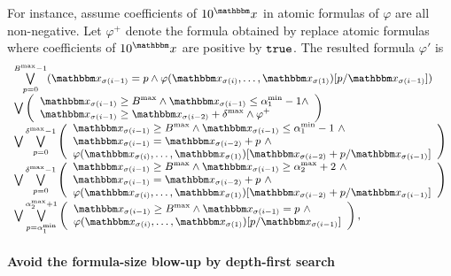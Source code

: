 For instance, assume coefficients of $10^\ivarx$ in atomic formulas of $\varphi$ are all non-negative. Let $\varphi^+$ denote the formula obtained by replace atomic formulas where coefficients of $10^\ivarx$ are positive by $\mathtt{true}$. The resulted formula $\varphi'$ is
\[
\small
\begin{array}{l}
\bigvee \limits_{p=0}^{B^{\max}-1} ( \ivarx_{\sigma(i-1)} = p \wedge \varphi(\ivarx_{\sigma(i)}, \ldots, \ivarx_{\sigma(1)}) [p/\ivarx_{\sigma(i-1)}])   \\
\bigvee \left(
    \begin{array}{l}
        \ivarx_{\sigma(i-1)} \ge B^{\max} \wedge \ivarx_{\sigma(i-1)} \le \alpha^{\min}_1  - 1  \wedge \\
        \ivarx_{\sigma(i-1)} \ge \ivarx_{\sigma(i-2)} +\delta^{\max} \wedge \varphi^+  
    \end{array}
    \right)\\
%
\bigvee \bigvee \limits_{p=0}^{\delta^{\max}-1} 
\left(
\begin{array}{l}
\ivarx_{\sigma(i-1)} \ge B^{\max} \wedge \ivarx_{\sigma(i-1)} \le \alpha^{\min}_1  -1 \ \wedge \\
 \ivarx_{\sigma(i-1)} = \ivarx_{\sigma(i-2)} +p\ \wedge\\
 \varphi(\ivarx_{\sigma(i)}, \ldots, \ivarx_{\sigma(1)})[\ivarx_{\sigma(i-2)} + p /\ivarx_{\sigma(i-1)}] 
\end{array}
\right)\\
\bigvee \bigvee \limits_{p=0}^{\delta^{\max}-1} 
\left(
\begin{array}{l}
\ivarx_{\sigma(i-1)} \ge B^{\max} \wedge \ivarx_{\sigma(i-1)} \ge \alpha^{\max}_2 + 2 \ \wedge \\
 \ivarx_{\sigma(i-1)} = \ivarx_{\sigma(i-2)} +p\ \wedge\\
 \varphi(\ivarx_{\sigma(i)}, \ldots, \ivarx_{\sigma(1)})[\ivarx_{\sigma(i-2)} + p /\ivarx_{\sigma(i-1)}] 
\end{array}
\right)\\
\bigvee \bigvee \limits_{p = \alpha^{\min}_1}^{\alpha^{\max}_2 + 1}
\left(
\begin{array}{l}
\ivarx_{\sigma(i-1)} \ge B^{\max} \wedge \ivarx_{\sigma(i-1)} = p\ \wedge \\
 \varphi(\ivarx_{\sigma(i)}, \ldots, \ivarx_{\sigma(1)})[p /\ivarx_{\sigma(i-1)}] 
\end{array}
\right),
\end{array}
\]


\paragraph{Avoid the formula-size blow-up by depth-first search}

